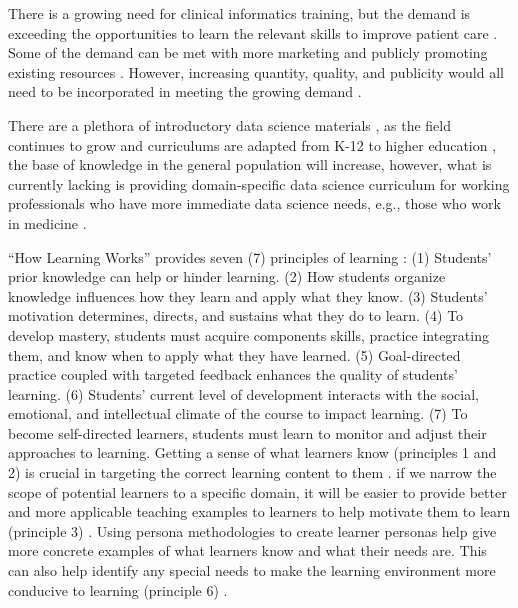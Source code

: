 \documentclass[030-workshop.tex]{subfiles}
\begin{document}
    There is a growing need for clinical informatics training,
    but the demand is exceeding the opportunities to learn the relevant skills to improve patient care
    \cite{americanmedicalassociationStudentInterestInformatics, banerjeeMedicalStudentAwareness2015}.
    Some of the demand can be met with more marketing and publicly promoting existing resources
    \cite{banerjeeMedicalStudentAwareness2015}.
    However, increasing quantity, quality, and publicity would all need to be incorporated
    in meeting the growing demand
    \cite{banerjeeMedicalStudentAwareness2015, payneBiomedicalInformaticsMeets2018}.

    There are a plethora of introductory data science materials
    \cite{krossDemocratizationDataScience2020},
    as the field continues to grow and curriculums are adapted from K-12 to higher education
    \cite{gaise2k12, gaise2016, ccdsc2021, csta2017},
    the base of knowledge in the general population will increase,
    however, what is currently lacking is providing domain-specific data science curriculum
    for working professionals who have more immediate data science needs, e.g., those who work in medicine
    \cite{krossDemocratizationDataScience2020, payneBiomedicalInformaticsMeets2018, dunnBuildingBiomedicalData2017, nationalinstitutesofhealthBigDataKnowledge2013, nationalinstitutesofhealthNIHStrategicPlan2020}.

    ``How Learning Works'' provides seven (7) principles of learning
    \cite{ambrose2010learning}:
    (1) Students' prior knowledge can help or hinder learning.
    (2) How students organize knowledge influences how they learn and apply what they know.
    (3) Students' motivation determines, directs, and sustains what they do to learn.
    (4) To develop mastery, students must acquire components skills, practice integrating them, and know when to apply what they have learned.
    (5) Goal-directed practice coupled with targeted feedback enhances the quality of students' learning.
    (6) Students' current level of development interacts with the social, emotional, and intellectual climate of the course to impact learning.
    (7) To become self-directed learners, students must learn to monitor and adjust their approaches to learning.
    Getting a sense of what learners know (principles 1 and 2) is crucial in targeting
    the correct learning content to them
    \cite{ambrose2010learning, Koch2016, wilson2019teaching}.
    if we narrow the scope of potential learners to a specific domain,
    it will be easier to provide better and more applicable teaching examples to learners
    to help motivate them to learn (principle 3)
    \cite{pruittPersonaLifecycleKeeping2006, schwartzParadoxChoiceWhy2016}.
    Using persona methodologies to create learner personas help give more concrete examples
    of what learners know and what their needs are.
    This can also help identify any special needs to make the learning environment more conducive to learning (principle 6)
    \cite{pruittPersonaLifecycleKeeping2006, schwartzParadoxChoiceWhy2016, RStudio2019}.
\end{document}
